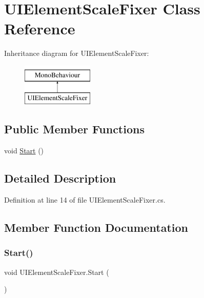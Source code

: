 \hypertarget{class_u_i_element_scale_fixer}{}\section{U\+I\+Element\+Scale\+Fixer Class Reference}
\label{class_u_i_element_scale_fixer}
Inheritance diagram for U\+I\+Element\+Scale\+Fixer\+:\begin{figure}[H]
\begin{center}
\leavevmode
\includegraphics[height=2.000000cm]{class_u_i_element_scale_fixer}
\end{center}
\end{figure}
\subsection*{Public Member Functions}
\begin{DoxyCompactItemize}
\item 
void \hyperlink{class_u_i_element_scale_fixer_a94b36fef223a77df5288804dd7ed4fa4}{Start} ()
\end{DoxyCompactItemize}


\subsection{Detailed Description}


Definition at line 14 of file U\+I\+Element\+Scale\+Fixer.\+cs.



\subsection{Member Function Documentation}
\mbox{\label{class_u_i_element_scale_fixer_a94b36fef223a77df5288804dd7ed4fa4}} 
\subsubsection{\texorpdfstring{Start()}{Start()}}
{\footnotesize\ttfamily void U\+I\+Element\+Scale\+Fixer.\+Start (\begin{DoxyParamCaption}{ }\end{DoxyParamCaption})}



